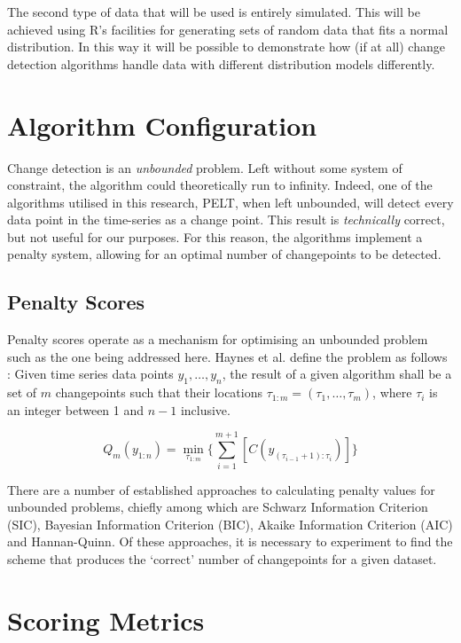 \documentclass{uvamscse}	%
\begin{document}
The second type of data that will be used is entirely simulated. This will be achieved using R's facilities for generating sets of random data that fits a normal distribution. In this way it will be possible to demonstrate how (if at all) change detection algorithms handle data with different distribution models differently.

\section{Algorithm Configuration}

Change detection is an \emph{unbounded} problem. Left without some system of constraint, the algorithm could theoretically run to infinity. Indeed, one of the algorithms utilised in this research, PELT, when left unbounded, will detect every data point in the time-series as a change point. This result is \textit{technically} correct, but not useful for our purposes. For this reason, the algorithms implement a penalty system, allowing for an optimal number of changepoints to be detected.

\subsection{Penalty Scores}

Penalty scores operate as a mechanism for optimising an unbounded problem such as the one being addressed here. Haynes et al. define the problem as follows \cite{Haynes2014}: Given time series data points $y_1,\ldots,y_n$, the result of a given algorithm shall be a set of $m$ changepoints such that their locations $\tau_{1:m} = (\tau_1,\ldots,\tau_m)$, where $\tau_i$ is an integer between 1 and $n-1$ inclusive.

\begin{equation}
    Q_m(y_{1:n}) = \min_{\tau_{1:m}} \{ \sum^{m+1}_{i=1}[C(y_{(\tau_{i - 1} + 1):\tau_i})] \}
\end{equation}

There are a number of established approaches to calculating penalty values for unbounded problems, chiefly among which are Schwarz Information Criterion (SIC), Bayesian Information Criterion (BIC), Akaike Information Criterion (AIC) and Hannan-Quinn. Of these approaches, it is necessary to experiment to find the scheme that produces the `correct' number of changepoints for a given dataset.

\section{Scoring Metrics}
\end{document}
